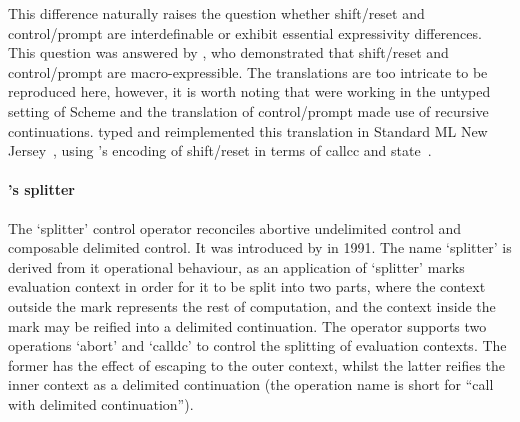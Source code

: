 \documentclass[12pt,phd,lfcs,twoside,openright,logo,leftchapter,normalheadings]{infthesis}
\theoremstyle{plain}
\theoremstyle{definition}
\begin{document}
This difference naturally raises the question whether shift/reset and
control/prompt are interdefinable or exhibit essential expressivity
differences. This question was answered by \citet{Shan04}, who
demonstrated that shift/reset and control/prompt are
macro-expressible. The translations are too intricate to be reproduced
here, however, it is worth noting that \citeauthor{Shan04} were
working in the untyped setting of Scheme and the translation of
control/prompt made use of recursive
continuations. \citet{BiernackiDS05} typed and reimplemented this
translation in Standard ML New Jersey~\cite{AppelM91}, using
\citeauthor{Filinski94}'s encoding of shift/reset in terms of callcc
and state~\cite{Filinski94}.
%
%
%

\paragraph{\citeauthor{QueinnecS91}'s splitter} The `splitter' control
operator reconciles abortive undelimited control and composable
delimited control. It was introduced by \citet{QueinnecS91} in
1991. The name `splitter' is derived from it operational behaviour, as
an application of `splitter' marks evaluation context in order for it
to be split into two parts, where the context outside the mark
represents the rest of computation, and the context inside the mark
may be reified into a delimited continuation. The operator supports
two operations `abort' and `calldc' to control the splitting of
evaluation contexts. The former has the effect of escaping to the
outer context, whilst the latter reifies the inner context as a
delimited continuation (the operation name is short for ``call with
delimited continuation'').
\end{document}
